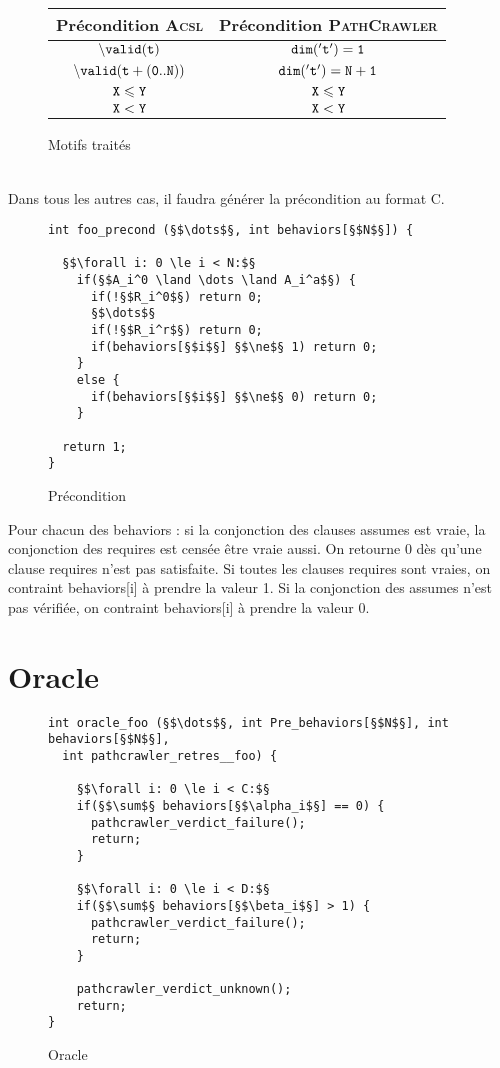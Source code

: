 \begin{figure}
  \centering
  \begin{tabular}{|c|c|}
    \hline
    Précondition \textsc{Acsl} & Précondition \textsc{PathCrawler}\\
    \hline
    ${\tt \backslash valid (t)}$ & ${\tt dim('t') = 1}$\\
    \hline
    ${\tt \backslash valid (t+(0..N))}$ & ${\tt dim('t') = N+1}$\\
    \hline
    ${\tt X \leq Y}$ & ${\tt X \leq Y}$\\
    \hline
    ${\tt X < Y}$ & ${\tt X < Y}$\\
    \hline
  \end{tabular}
  \caption{Motifs traités}
\end{figure}~\\
  
Dans tous les autres cas, il faudra générer la précondition au format C.\\

\begin{figure}[h]
  \begin{lstlisting}
int foo_precond (§$\dots$§, int behaviors[§$N$§]) {

  §$\forall i: 0 \le i < N:$§
    if(§$A_i^0 \land \dots \land A_i^a$§) {
      if(!§$R_i^0$§) return 0;
      §$\dots$§
      if(!§$R_i^r$§) return 0;
      if(behaviors[§$i$§] §$\ne$§ 1) return 0;
    }
    else {
      if(behaviors[§$i$§] §$\ne$§ 0) return 0;
    }

  return 1;
}
  \end{lstlisting}
  \caption{Précondition}
\end{figure}

Pour chacun des behaviors : si la conjonction des clauses assumes est vraie, la
conjonction des requires est censée être vraie aussi. On retourne 0 dès qu'une
clause requires n'est pas satisfaite. Si toutes les clauses requires sont
vraies, on contraint behaviors[i] à prendre la valeur 1.
Si la conjonction des assumes n'est pas vérifiée, on contraint behaviors[i] à
prendre la valeur 0.


\section{Oracle}


\begin{figure}[h]
  \begin{lstlisting}
int oracle_foo (§$\dots$§, int Pre_behaviors[§$N$§], int behaviors[§$N$§],
  int pathcrawler_retres__foo) {
  
    §$\forall i: 0 \le i < C:$§
    if(§$\sum$§ behaviors[§$\alpha_i$§] == 0) {
      pathcrawler_verdict_failure();
      return;
    }

    §$\forall i: 0 \le i < D:$§
    if(§$\sum$§ behaviors[§$\beta_i$§] > 1) {
      pathcrawler_verdict_failure();
      return;
    }

    pathcrawler_verdict_unknown();
    return;
}
  \end{lstlisting}
  \caption{Oracle}
\end{figure}

